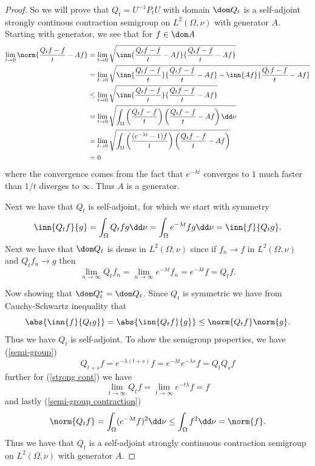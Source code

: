 \begin{proof}
	So we will prove that $Q_t = U^{-1}P_tU$ with domain $\dom Q_t$ is a self-adjoint strongly continous contraction semigroup on $L^2(\Omega, \nu)$ with generator $A$. Starting with generator, we see that for $f \in \dom A$
	\begin{align}
		\lim_{t \to 0} \norm{\frac{Q_tf-f}{t} - Af} &= \lim_{t \to 0}\sqrt{\inn{\frac{Q_tf-f}{t} - Af}{\frac{Q_tf-f}{t} - Af}} \\
		&= \lim_{t \to 0}\sqrt{\inn{\frac{Q_tf-f}{t}}{\frac{Q_tf-f}{t} - Af} - \inn{Af}{\frac{Q_tf-f}{t} - Af}} \\
		&\leq \lim_{t \to 0}\sqrt{\inn{\frac{Q_tf-f}{t}}{\frac{Q_tf-f}{t} - Af}} \\
		&= \lim_{t \to 0}\sqrt{\int_{\Omega}\left(\frac{Q_tf-f}{t}\right)\left(\frac{Q_tf-f}{t} - Af\right)  \dd \nu} \\
		&= \lim_{t \to 0}\sqrt{\int_{\Omega}\left(\frac{(e^{-\lambda t}-1)f}{t}\right)\left(\frac{Q_tf-f}{t} - Af\right)} \\
			&= 0
	\end{align}
	where the convergence comes from the fact that $e^{-\lambda t}$ converges to $1$ much faster than $1/t$ diverges to $\infty$.  Thus $A$ is a generator.
	
	Next we have that $Q_t$ is self-adjoint, for which we start with symmetry
	\begin{equation}
		\inn{Q_t f}{g} = \int_{\Omega} Q_t f g \dd \nu = \int_{\Omega} e^{-\lambda t} f g \dd \nu = \inn{f}{Q_t g}.
	\end{equation}
	Next we have that $\dom Q_t$ is dense in $L^2(\Omega, \nu)$ since if $f_n \to f$ in $L^2(\Omega, \nu)$ and $Q_t f_n \to g$ then
	\begin{equation}
		\lim_{n \to \infty} Q_t f_n = \lim_{n \to \infty} e^{-\lambda t}f_n = e^{-\lambda t}f = Q_t f.
	\end{equation} 
	
	Now showing that $\dom Q_{t}^{*} = \dom Q_t$. Since $Q_t$ is symmetric we have from Cauchy-Schwartz inequality that
	\begin{equation}\label{operatorAndAdjointHaveSameDom}
		\abs{\inn{f}{Q_tg}} = \abs{\inn{Q_t f}{g}} \leq \norm{Q_t f} \norm{g}.
	\end{equation}
	Thus we have $Q_t$ is self-adjoint. To show the semigroup properties, we have (\ref{semi-group})
	\begin{equation}
		Q_{t+s}f = e^{-\lambda (t +s )}f = e^{-\lambda t}e^{-\lambda s}f = Q_t Q_s f
	\end{equation}
	further for (\ref{strong cont}) we have
	\begin{equation}
		\lim_{t \to \infty} Q_t f = \lim_{t \to \infty} e^{-t\lambda} f = f
	\end{equation}
	and lastly (\ref{semi-group contraction})
	\begin{equation}
		\norm{Q_t f} = \int_{\Omega} (e^{-\lambda t}f)^2 \dd \nu\leq \int_{\Omega} f^2 \dd \nu = \norm{f} .
	\end{equation}
	Thus we have that $Q_t$ is a self-adjoint strongly continuous contraction semigroup on $L^2(\Omega, \nu)$ with generator $A$.
\end{proof}

